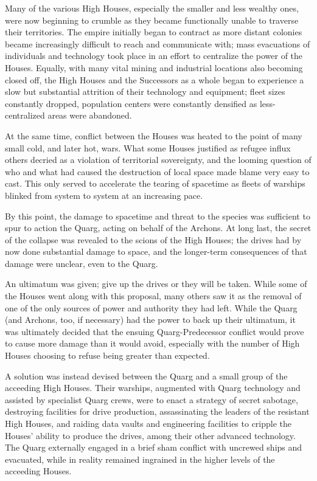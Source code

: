 \documentclass[11pt]{report}
\begin{document}
    Many of the various High Houses, especially the smaller and less wealthy ones, were now beginning to crumble as they became functionally unable to traverse their territories. The empire initially began to contract as more distant colonies became increasingly difficult to reach and communicate with; mass evacuations of individuals and technology took place in an effort to centralize the power of the Houses. Equally, with many vital mining and industrial locations also becoming closed off, the High Houses and the Successors as a whole began to experience a slow but substantial attrition of their technology and equipment; fleet sizes constantly dropped, population centers were constantly densified as less-centralized areas were abandoned.

    At the same time, conflict between the Houses was heated to the point of many small cold, and later hot, wars. What some Houses justified as refugee influx others decried as a violation of territorial sovereignty, and the looming question of who and what had caused the destruction of local space made blame very easy to cast. This only served to accelerate the tearing of spacetime as fleets of warships blinked from system to system at an increasing pace.

    By this point, the damage to spacetime and threat to the species was sufficient to spur to action the Quarg, acting on behalf of the Archons. At long last, the secret of the collapse was revealed to the scions of the High Houses; the drives had by now done substantial damage to space, and the longer-term consequences of that damage were unclear, even to the Quarg. 
    
    An ultimatum was given; give up the drives or they will be taken. While some of the Houses went along with this proposal, many others saw it as the removal of one of the only sources of power and authority they had left. While the Quarg (and Archons, too, if necessary) had the power to back up their ultimatum, it was ultimately decided that the ensuing Quarg-Predecessor conflict would prove to cause more damage than it would avoid, especially with the number of High Houses choosing to refuse being greater than expected.

    A solution was instead devised between the Quarg and a small group of the acceeding High Houses. Their warships, augmented with Quarg technology and assisted by specialist Quarg crews, were to enact a strategy of secret sabotage, destroying facilities for drive production, assassinating the leaders of the resistant High Houses, and raiding data vaults and engineering facilities to cripple the Houses' ability to produce the drives, among their other advanced technology. The Quarg externally engaged in a brief sham conflict with uncrewed ships and evacuated, while in reality remained ingrained in the higher levels of the acceeding Houses.
\end{document}
